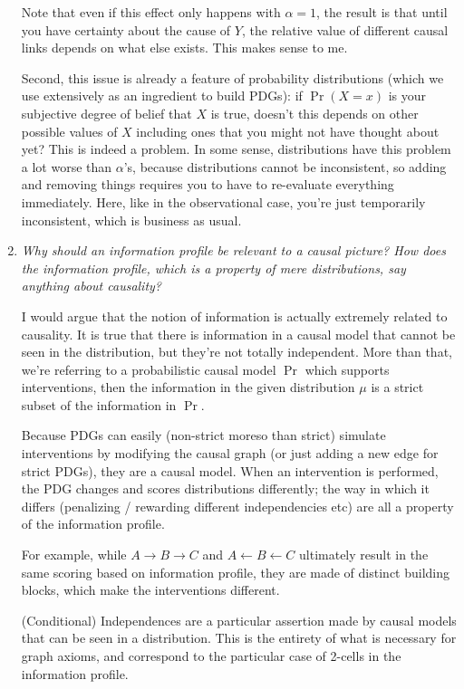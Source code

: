 \documentclass{article}
\theoremstyle{plain}
\theoremstyle{definition}
\theoremstyle{remark}
\begin{document}
\begin{enumerate}[itemsep=1em]
	Note that even if this effect only happens with $\alpha=1$, the result is that until you have certainty about the cause of $Y$, the relative value of different causal links depends on what else exists. This makes sense to me.
	
	Second, this issue is already a feature of probability distributions (which we use extensively as an ingredient to build PDGs): if $\Pr(X=x)$ is your subjective degree of belief that $X$ is true, doesn't this depends on other possible values of $X$ including ones that you might not have thought about yet? This is indeed a problem. In some sense, distributions have this problem a lot worse than $\alpha$'s, because distributions cannot be inconsistent, so adding and removing things requires you to have to re-evaluate everything immediately. Here, like in the observational case, you're just temporarily inconsistent, which is business as usual. 
	
		
	
	\item \textit{Why should an information profile be relevant to a causal picture? How does the information profile, which is a property of mere distributions, say anything about causality?}
	
	I would argue that the notion of information is actually extremely related to causality. It is true that there is information in a causal model that cannot be seen in the distribution, but they're not totally independent. More than that, we're referring to a probabilistic causal model $\Pr$ which supports interventions, then the information in the given distribution $\mu$ is a strict subset of the information in $\Pr$. 
	
	Because PDGs can easily (non-strict moreso than strict) simulate interventions by modifying the causal graph (or just adding a new edge for strict PDGs), they are a causal model. When an intervention is performed, the PDG changes and scores distributions differently; the way in which it differs (penalizing / rewarding different independencies etc) are all a property of the information profile.
	
	For example, while $A \to B \to C$ and $A \gets B \gets C$ ultimately result in the same scoring based on information profile, they are made of distinct building blocks, which make the interventions different.
	
	(Conditional) Independences are a particular assertion made by causal models that can be seen in a distribution. This is the entirety of what is necessary for graph axioms, and correspond to the particular case of 2-cells in the information profile.
	

\end{enumerate}
\end{document}
